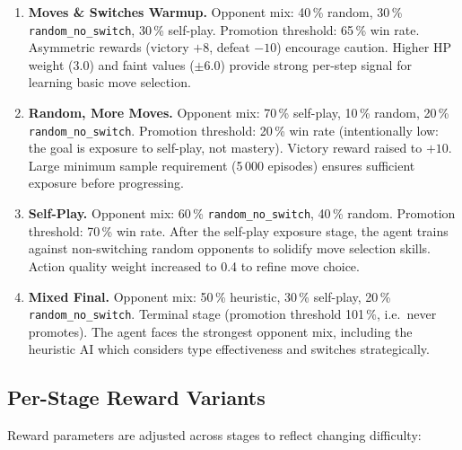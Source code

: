 \begin{enumerate}
  \item \textbf{Moves \& Switches Warmup.}
        Opponent mix: 40\,\% random, 30\,\% \texttt{random\_no\_switch},
        30\,\% self-play.  Promotion threshold: 65\,\% win rate.
        Asymmetric rewards (victory $+8$, defeat $-10$) encourage caution.
        Higher HP weight (3.0) and faint values ($\pm 6.0$) provide strong
        per-step signal for learning basic move selection.

  \item \textbf{Random, More Moves.}
        Opponent mix: 70\,\% self-play, 10\,\% random,
        20\,\% \texttt{random\_no\_switch}.  Promotion threshold: 20\,\% win
        rate (intentionally low: the goal is exposure to self-play, not
        mastery).  Victory reward raised to $+10$.  Large minimum sample
        requirement (5\,000 episodes) ensures sufficient exposure before
        progressing.

  \item \textbf{Self-Play.}
        Opponent mix: 60\,\% \texttt{random\_no\_switch},
        40\,\% random.  Promotion threshold: 70\,\% win rate.
        After the self-play exposure stage, the agent trains against
        non-switching random opponents to solidify move selection skills.
        Action quality weight increased to 0.4 to refine move choice.

  \item \textbf{Mixed Final.}
        Opponent mix: 50\,\% heuristic, 30\,\% self-play,
        20\,\% \texttt{random\_no\_switch}.  Terminal stage (promotion
        threshold 101\,\%, i.e.\ never promotes).  The agent faces the
        strongest opponent mix, including the heuristic AI which considers
        type effectiveness and switches strategically.
\end{enumerate}


\subsection{Per-Stage Reward Variants}

Reward parameters are adjusted across stages to reflect changing difficulty:

